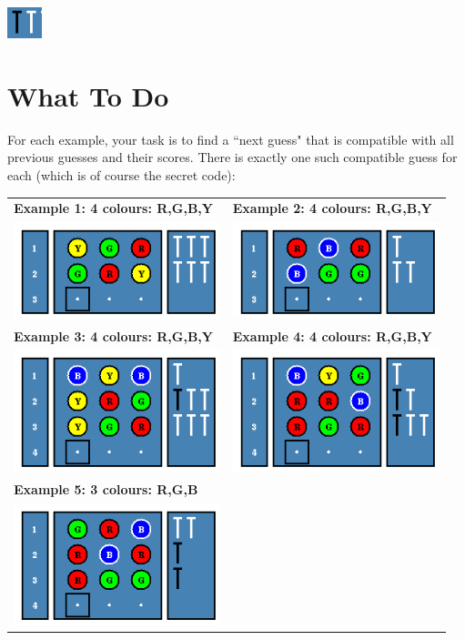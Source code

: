 \documentclass{article}
\begin{document}
\includegraphics[width=1cm]{pegs.png}

\section*{What To Do}

For each example, your task is to find a ``next guess" that is compatible
with all previous guesses and their scores.  There is exactly one such
compatible guess for each (which is of course the secret code):

\begin{tabular}{l l}

{\bf Example 1: 4 colours: R,G,B,Y}    & {\bf Example 2: 4 colours: R,G,B,Y} \\
\includegraphics[width=6cm]{eg1.png}   & \includegraphics[width=6cm]{eg2.png} \\

{\bf Example 3: 4 colours: R,G,B,Y}    & {\bf Example 4: 4 colours: R,G,B,Y} \\
\includegraphics[width=6cm]{eg3.png}   & \includegraphics[width=6cm]{eg4.png} \\

{\bf Example 5: 3 colours: R,G,B}     \\
\includegraphics[width=6cm]{eg5.png}  \\

\end{tabular}
\end{document}
